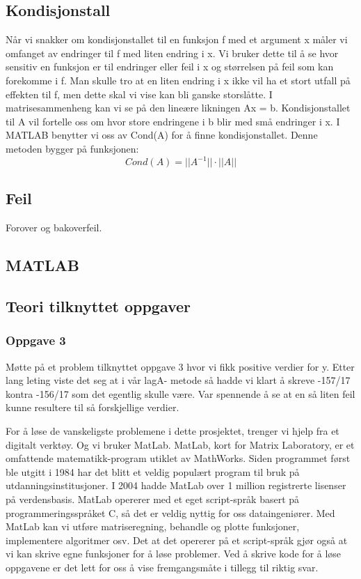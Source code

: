  \subsection{Kondisjonstall}
 Når vi snakker om kondisjonstallet til en funksjon f med et argument x måler vi omfanget av endringer til f med liten endring i x. Vi bruker dette til å se hvor sensitiv en funksjon er til endringer eller feil i x og størrelsen på feil som kan forekomme i f. Man skulle tro at en liten endring i x ikke vil ha et stort utfall på effekten til f, men dette skal vi vise kan bli ganske storslåtte. I matrisesammenheng kan vi se på den lineære likningen Ax = b. Kondisjonstallet til A vil fortelle oss om hvor store endringene i b blir med små endringer i x. I MATLAB benytter vi oss av Cond(A) for å finne kondisjonstallet. Denne metoden bygger på funksjonen:
 \
 \begin{equation}
 Cond(A) = ||A^{-1}|| \cdot ||A||
 \end{equation}

\subsection{Feil}
Forover og bakoverfeil.

\subsection{MATLAB}

\subsection{Teori tilknyttet oppgaver}
\subsubsection{Oppgave 3}
Møtte på et problem tilknyttet oppgave 3 hvor vi fikk positive verdier for y. Etter lang leting viste det seg at i vår lagA- metode så hadde vi klart å skreve -157/17 kontra -156/17 som det egentlig skulle være. Var spennende å se at en så liten feil kunne resultere til så forskjellige verdier. 

For å løse de vanskeligste problemene i dette prosjektet, trenger vi hjelp fra et digitalt verktøy. Og vi bruker MatLab. MatLab, kort for Matrix Laboratory, er et omfattende matematikk-program utiklet av MathWorks. Siden programmet først ble utgitt i 1984 har det blitt et veldig populært program til bruk på utdanningsinstitusjoner. I 2004 hadde MatLab over 1 million registrerte lisenser på verdensbasis.
MatLab opererer med et eget script-språk basert på programmeringsspråket C, så det er veldig nyttig for oss dataingeniører. Med MatLab kan vi utføre matriseregning, behandle og plotte funksjoner, implementere algoritmer osv. Det at det opererer på et script-språk gjør også at vi kan skrive egne funksjoner for å løse problemer. Ved å skrive kode for å løse oppgavene er det lett for oss å vise fremgangsmåte i tillegg til riktig svar.


